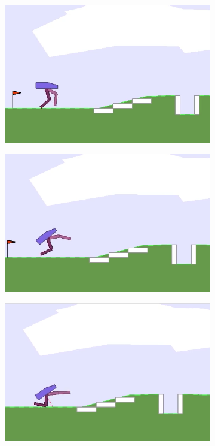 \documentclass{article}
\begin{document}
\begin{figure}[!p]
\centering
  \begin{subfigure}{0.18\textwidth}
  \centering
  \includegraphics[width=\textwidth]{figures/hardcore/v1}
  \caption{}
  \end{subfigure}
  \begin{subfigure}{0.18\textwidth}
  \centering
  \includegraphics[width=\textwidth]{figures/hardcore/v2}
  \caption{}
  \end{subfigure}
  \begin{subfigure}{0.18\textwidth}
  \centering
  \includegraphics[width=\textwidth]{figures/hardcore/v3}

\end{subfigure}
\end{figure}
\end{document}
